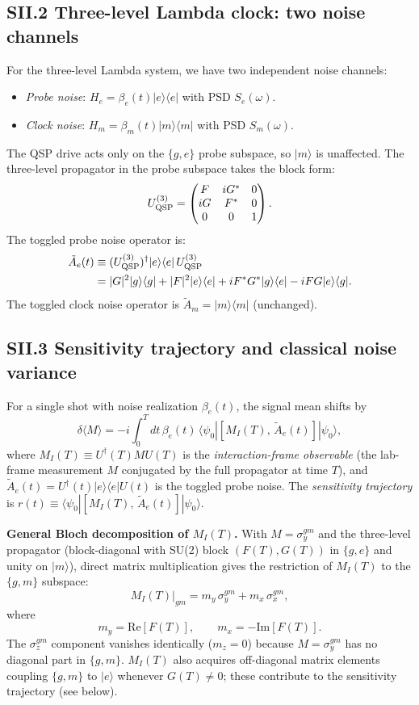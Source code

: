 \documentclass[aps,pra,twocolumn,superscriptaddress,longbibliography]{revtex4-2}
\newcommand{\be}{\begin{equation}}
\newcommand{\ee}{\end{equation}}
\begin{document}
\subsection*{SII.2 Three-level Lambda clock: two noise channels}

For the three-level Lambda system, we have two independent noise channels:
\begin{itemize}
  \item \emph{Probe noise}: $H_e = \beta_e(t)|e\rangle\langle e|$ with PSD $S_e(\omega)$.
  \item \emph{Clock noise}: $H_m = \beta_m(t)|m\rangle\langle m|$ with PSD $S_m(\omega)$.
\end{itemize}
The QSP drive acts only on the $\{g,e\}$ probe subspace, so $|m\rangle$ is unaffected.
The three-level propagator in the probe subspace takes the block form:
\be
  U_{\rm QSP}^{(3)} = \begin{pmatrix}
    F & iG^* & 0 \\ iG & F^* & 0 \\ 0 & 0 & 1
  \end{pmatrix}.
\ee
The toggled probe noise operator is:
\begin{align}
  \tilde{A}_e(t)
  &\equiv (U_{\rm QSP}^{(3)})^\dagger |e\rangle\langle e|\, U_{\rm QSP}^{(3)} \\
  &= |G|^2|g\rangle\langle g| + |F|^2|e\rangle\langle e|
     + iF^*G^*|g\rangle\langle e| - iFG|e\rangle\langle g|.
\end{align}
The toggled clock noise operator is $\tilde{A}_m = |m\rangle\langle m|$ (unchanged).

\subsection*{SII.3 Sensitivity trajectory and classical noise variance}

For a single shot with noise realization $\beta_e(t)$, the signal mean shifts by
\be
  \delta\langle M\rangle = -i\int_0^T dt\,\beta_e(t)\,
    \langle\psi_0|[M_I(T),\,\tilde{A}_e(t)]|\psi_0\rangle,
\ee
where $M_I(T) \equiv U^\dagger(T) M U(T)$ is the \emph{interaction-frame observable}
(the lab-frame measurement $M$ conjugated by the full propagator at time $T$),
and $\tilde{A}_e(t) = U^\dagger(t)|e\rangle\langle e|U(t)$ is the toggled probe noise.
The \emph{sensitivity trajectory} is
$r(t) \equiv \langle\psi_0|[M_I(T),\,\tilde{A}_e(t)]|\psi_0\rangle$.

\textbf{General Bloch decomposition of $M_I(T)$.}
With $M = \sigma_y^{gm}$ and the three-level propagator
(block-diagonal with SU(2) block $(F(T),G(T))$ in $\{g,e\}$ and unity on $|m\rangle$),
direct matrix multiplication gives the restriction of $M_I(T)$ to the $\{g,m\}$ subspace:
\be
  M_I(T)\big|_{gm} = m_y\,\sigma_y^{gm} + m_x\,\sigma_x^{gm},
  \label{eq:MI_bloch}
\ee
where
\be
  m_y = \mathrm{Re}[F(T)],\qquad m_x = -\mathrm{Im}[F(T)].
  \label{eq:bloch_components}
\ee
The $\sigma_z^{gm}$ component vanishes identically ($m_z = 0$) because $M = \sigma_y^{gm}$
has no diagonal part in $\{g,m\}$.
$M_I(T)$ also acquires off-diagonal matrix elements coupling $\{g,m\}$ to $|e\rangle$
whenever $G(T)\neq 0$; these contribute to the sensitivity trajectory (see below).
\end{document}
